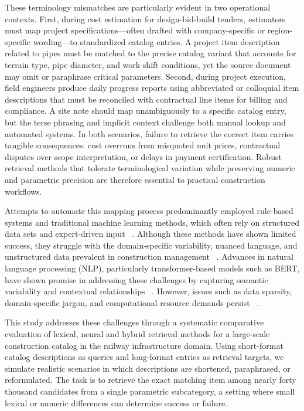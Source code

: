 \documentclass[preprint,12pt]{elsarticle}
\begin{document}
These terminology mismatches are particularly evident in two operational contexts. First, during cost estimation for design-bid-build tenders, estimators must map project specifications—often drafted with company-specific or region-specific wording—to standardized catalog entries. A project item description related to pipes must be matched to the precise catalog variant that accounts for terrain type, pipe diameter, and work-shift conditions, yet the source document may omit or paraphrase critical parameters. Second, during project execution, field engineers produce daily progress reports using abbreviated or colloquial item descriptions that must be reconciled with contractual line items for billing and compliance. A site note should map unambiguously to a specific catalog entry, but the terse phrasing and implicit context challenge both manual lookup and automated systems. In both scenarios, failure to retrieve the correct item carries tangible consequences: cost overruns from misquoted unit prices, contractual disputes over scope interpretation, or delays in payment certification. Robust retrieval methods that tolerate terminological variation while preserving numeric and parametric precision are therefore essential to practical construction workflows.

Attempts to automate this mapping process predominantly employed rule-based systems and traditional machine learning methods, which often rely on structured data sets and expert-driven input ~\cite{caldasAutomatingHierarchicalDocument2003, natural_wu_2022}. Although these methods have shown limited success, they struggle with the domain-specific variability, nuanced language, and unstructured data prevalent in construction management ~\cite{rampiniArtificialIntelligenceConstruction2022, baekCriticalReviewTextbased2021}. Advances in natural language processing (NLP), particularly transformer-based models such as BERT, have shown promise in addressing these challenges by capturing semantic variability and contextual relationships ~\cite{tangAutomatedConstructionQuantity2022, dezaMachineLearningApproach2022}. However, issues such as data sparsity, domain-specific jargon, and computational resource demands persist ~\cite{chungComparingNaturalLanguage2023, martinez-rojasUsingClassificationTechniques2018}.

This study addresses these challenges through a systematic comparative evaluation of lexical, neural and hybrid retrieval methods for a large-scale construction catalog in the railway infrastructure domain. Using short-format catalog descriptions as queries and long-format entries as retrieval targets, we simulate realistic scenarios in which descriptions are shortened, paraphrased, or reformulated. The task is to retrieve the exact matching item among nearly forty thousand candidates from a single parametric subcategory, a setting where small lexical or numeric differences can determine success or failure.
\end{document}

